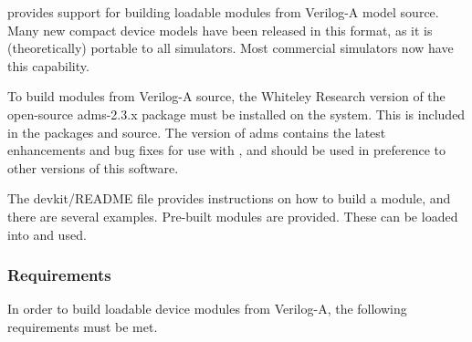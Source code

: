 
{\WRspice} provides support for building loadable modules
from Verilog-A model source.  Many new compact device models have been
released in this format, as it is (theoretically) portable to all
simulators.  Most commercial simulators now have this capability.

To build modules from Verilog-A source, the Whiteley Research version
of the open-source {\vt adms-2.3.x} package must be installed on the
system.  This is included in the {\XicTools} packages and source.  The
{\XicTools} version of {\vt adms} contains the latest enhancements and
bug fixes for use with {\WRspice}, and should be used in preference to
other versions of this software.

The {\vt devkit/README} file provides instructions on how to build a
module, and there are several examples.  Pre-built modules are
provided.  These can be loaded into {\WRspice} and used.

\subsubsection{Requirements}

In order to build loadable device modules from Verilog-A, the
following requirements must be met.


